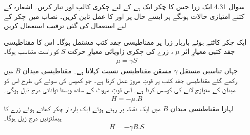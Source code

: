 سوال 
4.31
ایک زرا جس کا چکر ایک ہے کے لیے چکری کالپ 
اور
تیار کریں۔ اشعارہ 
کے کتنے امتیازی حالات ہونگے ہر ایسے حال پر 
اور
کا عمل تاین کریں۔ نصاب میں 
چکر کے لیے استعمال کی گئی ترقیب استعمال کریں

ایک چکر کاٹتے ہوئے باربار زرا پر مقناطیسی جفد کتب مشتمل ہوگا۔ اس کا مقناطیسی جفد کتبی معیارِ اثر $\mu$ ، زرے کی چکری زاویائی معیارِ حرکت $S$ کو راست متناسب ہوگا۔
\begin{align}
\mu = \gamma S
\end{align}
جہاں تناسبی مستقل $\gamma$ مسقن مقناطیسی نسبت کہلاتا ہے۔ مقناطیسی میدان $B$ میں رکھے گئے مقناطیسی جفد کتب پر قوتِ مروڑ
عمل کرتا ہے۔ جو کمپس کی سوئے کی طرح اس کو میدان کے متوازج لانے کی کوسس کرتا ہے۔ اس قوتِ مروٹ کے ساتھ وبستا توانائی درج ذیل ہوگی۔
\begin{align}
H = -\mu . B
\end{align}
لہازا مقناطیسی میدان $B$ میں ایک نقطہ پر رہتے ہوئے ایک باردار چکر کھاتے ہوئے زرے کا ہیملٹونیں درج زیل ہوگا۔
\begin{align}
H = -\gamma B.S
\end{align}


